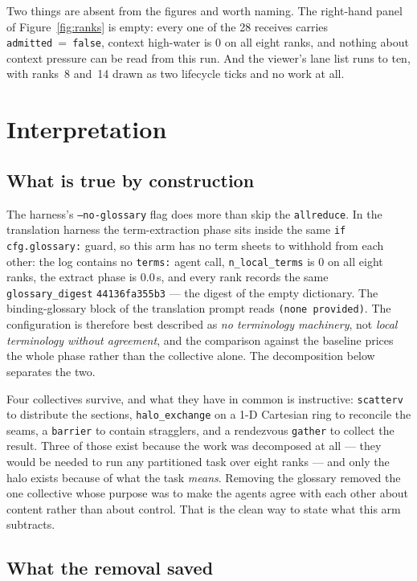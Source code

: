 \documentclass[11pt]{article}
\begin{document}
Two things are absent from the figures and worth naming. The right-hand panel of
Figure~\ref{fig:ranks} is empty: every one of the 28 receives carries
\texttt{admitted}~=~\texttt{false}, context high-water is 0 on all eight ranks, and nothing about
context pressure can be read from this run. And the viewer's lane list runs to ten, with ranks~8
and~14 drawn as two lifecycle ticks and no work at all.

\section{Interpretation}

\subsection*{What is true by construction}

The harness's \texttt{--no-glossary} flag does more than skip the \texttt{allreduce}. In the
translation harness the term-extraction phase sits inside the same
\texttt{if cfg.glossary:} guard, so this arm has no term sheets to withhold from each other: the
log contains no \texttt{terms:} agent call, \texttt{n\_local\_terms} is 0 on all eight ranks, the
extract phase is 0.0\,s, and every rank records the same \texttt{glossary\_digest}
\texttt{44136fa355b3} --- the digest of the empty dictionary. The binding-glossary block of the
translation prompt reads \texttt{(none provided)}. The configuration is therefore best described
as \emph{no terminology machinery}, not \emph{local terminology without agreement}, and the
comparison against the baseline prices the whole phase rather than the collective alone. The
decomposition below separates the two.

Four collectives survive, and what they have in common is instructive: \texttt{scatterv} to
distribute the sections, \texttt{halo\_exchange} on a 1-D Cartesian ring to reconcile the seams,
a \texttt{barrier} to contain stragglers, and a rendezvous \texttt{gather} to collect the result.
Three of those exist because the work was decomposed at all --- they would be needed to run any
partitioned task over eight ranks --- and only the halo exists because of what the task
\emph{means}. Removing the glossary removed the one collective whose purpose was to make the
agents agree with each other about content rather than about control. That is the clean way to
state what this arm subtracts.

\subsection*{What the removal saved}
\end{document}
